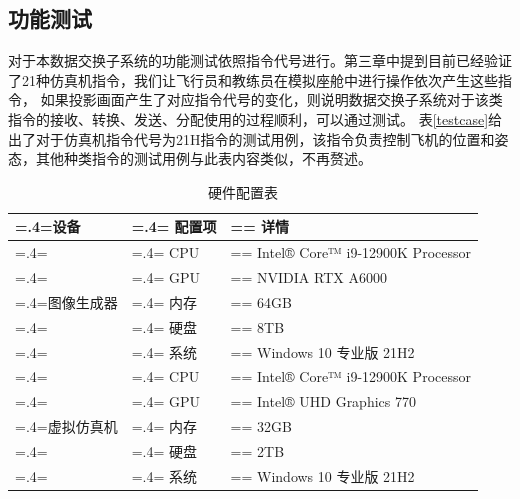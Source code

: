\subsection{功能测试}
对于本数据交换子系统的功能测试依照指令代号进行。第三章中提到目前已经验证了21种仿真机指令，我们让飞行员和教练员在模拟座舱中进行操作依次产生这些指令，
如果投影画面产生了对应指令代号的变化，则说明数据交换子系统对于该类指令的接收、转换、发送、分配使用的过程顺利，可以通过测试。
表\ref{testcase}给出了对于仿真机指令代号为21H指令的测试用例，该指令负责控制飞机的位置和姿态，其他种类指令的测试用例与此表内容类似，不再赘述。
\clearpage
\begin{table}[h!]
    \begin{center}
        \caption{硬件配置表}
        \label{ffshard}
        \renewcommand\arraystretch{1.5}
        \begin{tabularx}{\textwidth}{ 
             >{\centering\arraybackslash\hsize=.4\hsize\linewidth=\hsize}X 
             >{\centering\arraybackslash\hsize=.4\hsize\linewidth=\hsize}X 
             >{\centering\arraybackslash\hsize=\hsize\linewidth=\hsize}X 
             }
             \hline
            \textbf{设备} & \textbf{配置项} & \textbf{详情}\\         
             \hline
             & CPU & Intel® Core™ i9-12900K Processor\\
           
             & GPU & NVIDIA RTX A6000\\
             
             图像生成器 & 内存 & 64GB\\
            
             & 硬盘 & 8TB\\
             
             & 系统 & Windows 10 专业版 21H2\\
             \hline
             & CPU & Intel® Core™ i9-12900K Processor\\
           
             & GPU & Intel® UHD Graphics 770\\
             
             虚拟仿真机 & 内存 & 32GB\\
            
             & 硬盘 & 2TB\\
             
             & 系统 & Windows 10 专业版 21H2\\
             \hline
             
            \end{tabularx}
    \end{center}
\end{table}
